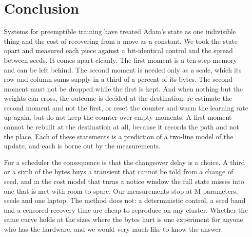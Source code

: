 \section{Conclusion}
\label{sec:conclusion}

Systems for preemptible training have treated Adam's state as one indivisible thing and the cost of recovering from a
move as a constant. We took the state apart and measured each piece against a bit-identical control and the spread
between seeds. It comes apart cleanly. The first moment is a ten-step memory and can be left behind. The second
moment is needed only as a scale, which its row and column sums supply in a third of a percent of its bytes. The
second moment must not be dropped while the first is kept. And when nothing but the weights can cross, the outcome is
decided at the destination: re-estimate the second moment and not the first, or reset the counter and warm the
learning rate up again, but do not keep the counter over empty moments. A first moment cannot be rebuilt at the
destination at all, because it records the path and not the place. Each of these statements is a prediction of a
two-line model of the update, and each is borne out by the measurements.

For a scheduler the consequence is that the changeover delay is a choice. A third or a sixth of the bytes buys a
transient that cannot be told from a change of seed, and in the cost model that turns a notice window the full state
misses into one that is met with room to spare. Our measurements stop at \largeParams{}M parameters, \nSeedsMax{} seeds
and one laptop. The method does not: a deterministic control, a seed band and a censored recovery time are cheap to
reproduce on any cluster. Whether the same curve holds at the sizes where the bytes hurt is one experiment for anyone
who has the hardware, and we would very much like to know the answer.
